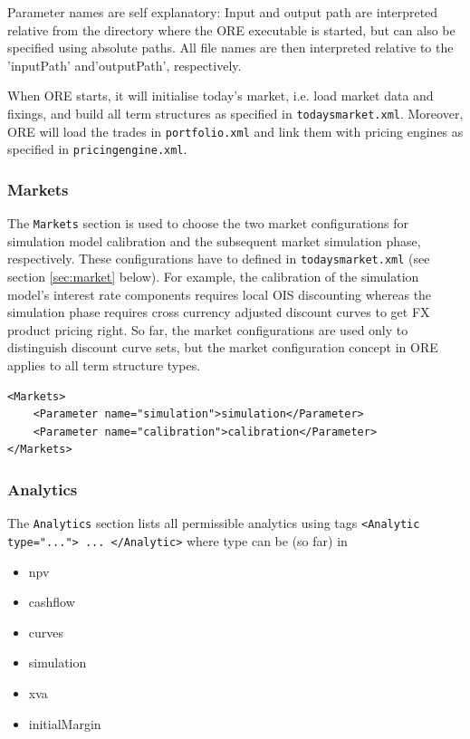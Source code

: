 \documentclass[12pt, a4paper]{article}
\begin{document}
Parameter names are self explanatory: Input and output path are interpreted relative from the directory where the ORE executable is started, but can also be specified using absolute paths. All file names are then interpreted relative to the 'inputPath' and'outputPath', respectively. 

When ORE starts, it will initialise today's market, i.e. load market data and fixings, and build all term structures as specified in {\tt todaysmarket.xml}. 
Moreover, ORE will load the trades in {\tt portfolio.xml} and link them with pricing engines as specified in {\tt pricingengine.xml}.    

\subsubsection*{Markets}

The {\tt Markets} section is used to choose the two market configurations for simulation model calibration and the subsequent market simulation phase, respectively. These configurations have to defined in {\tt todaysmarket.xml} (see section \ref{sec:market} below). For example, the calibration of the simulation model's interest rate components requires local OIS discounting whereas the simulation phase requires cross currency adjusted discount curves to get FX product pricing right. So far, the market configurations are used only to distinguish discount curve sets, but the market configuration concept in ORE applies to all term structure types.

{\footnotesize
\begin{lstlisting}[caption={ORE markets},
 	label=lst:ore_markets]
<Markets>
	<Parameter name="simulation">simulation</Parameter>
	<Parameter name="calibration">calibration</Parameter>
</Markets>
\end{lstlisting}
}

\subsubsection*{Analytics}

The {\tt Analytics} section lists all permissible analytics using tags {\tt <Analytic type="..."> ... </Analytic>} where type can be (so far) in
\begin{itemize}
\item npv
\item cashflow
\item curves
\item simulation
\item xva
\item initialMargin
\end{itemize}
\end{document}
